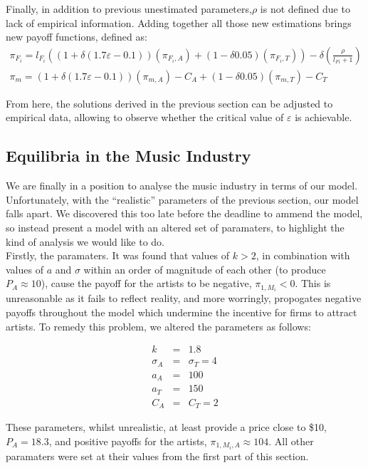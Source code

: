 \documentclass[a4paper,12pt]{article}
\numberwithin{equation}{section}
\newcommand{\artistpayoff}[2]{\pi_{#1, M_{#2}}}
\newcommand{\artistalbum}[2]{\pi_{#1, M_{#2}, A}}
\begin{document}
Finally, in addition to previous unestimated parameters,$\rho$ is
not defined due to lack of empirical information. Adding together
all those new estimations brings new payoff functions, defined as:
\begin{eqnarray*}
\pi_{F_{i}}=l_{F_{i}}((1+\delta(1.7\varepsilon-0.1))(\pi_{F_{i},A})+(1-\delta0.05)(\pi_{F_{i},T}))-\delta(\frac{\rho}{l_{Fi}+1})\\
\pi_{m}=(1+\delta(1.7\varepsilon-0.1))(\pi_{m,A})-C_{A}+(1-\delta0.05)(\pi_{m,T})-C_{T}
\end{eqnarray*}


From here, the solutions derived in the previous section can be adjusted
to empirical data, allowing to observe whether the critical value
of $\varepsilon$ is achievable.

\subsection{Equilibria in the Music Industry}

We are finally in a position to analyse the music industry in terms of our model. Unfortunately, with the ``realistic'' parameters of the previous section, our model falls apart. We discovered this too late before the deadline to ammend the model, so instead present a model with an altered set of paramaters, to highlight the kind of analysis we would like to do.\\

Firstly, the paramaters. It was found that values of $k > 2$, in combination with values of $a$ and $\sigma$ within an order of magnitude of each other (to produce $P_A \approx 10$), cause the payoff for the artists to be negative, $\artistpayoff{1}{i} < 0$. This is unreasonable as it fails to reflect reality, and more worringly, propogates negative payoffs throughout the model which undermine the incentive for firms to attract artists. To remedy this problem, we altered the parameters as follows:

\begin{eqnarray*}
k & = & 1.8\\
\sigma_A & = & \sigma_T = 4\\
a_A & = & 100\\
a_T & = & 150\\
C_A & = & C_T = 2
\end{eqnarray*}

These parameters, whilst unrealistic, at least provide a price close to \$10, $P_A = 18.3$, and positive payoffs for the artists, $\artistalbum{1}{i} \approx 104$. All other paramaters were set at their values from the first part of this section.\\
\end{document}
